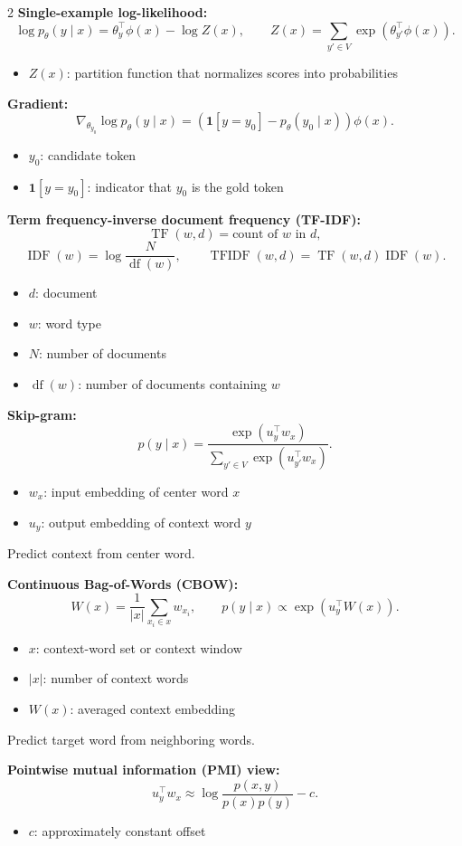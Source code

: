 \documentclass[10pt]{article}
\newenvironment{symdefs}{\begin{itemize}[leftmargin=1.1em, topsep=1pt, itemsep=0pt, parsep=0pt]}{\end{itemize}}
\newcommand{\sym}[2]{\item \textbf{#1}: #2}
\begin{document}
\begin{multicols*}{2}
\textbf{Single-example log-likelihood:}
\[
\log p_\theta(y \mid x)
=
\theta_y^\top \phi(x)-\log Z(x),
\qquad
Z(x)=\sum_{y' \in V}\exp(\theta_{y'}^\top \phi(x)).
\]
\begin{symdefs}
\sym{\(Z(x)\)}{partition function that normalizes scores into probabilities}
\end{symdefs}

\textbf{Gradient:}
\[
\nabla_{\theta_{y_0}}\log p_\theta(y \mid x)
=
\left(\mathbf{1}[y=y_0]-p_\theta(y_0 \mid x)\right)\phi(x).
\]
\begin{symdefs}
\sym{\(y_0\)}{candidate token}
\sym{\(\mathbf{1}[y=y_0]\)}{indicator that \(y_0\) is the gold token}
\end{symdefs}

\textbf{Term frequency-inverse document frequency (TF-IDF):}
\[
\operatorname{TF}(w,d)=\text{count of } w \text{ in } d,
\]
\[
\operatorname{IDF}(w)=\log \frac{N}{\operatorname{df}(w)},
\qquad
\operatorname{TFIDF}(w,d)=\operatorname{TF}(w,d)\operatorname{IDF}(w).
\]
\begin{symdefs}
\sym{\(d\)}{document}
\sym{\(w\)}{word type}
\sym{\(N\)}{number of documents}
\sym{\(\operatorname{df}(w)\)}{number of documents containing \(w\)}
\end{symdefs}

\textbf{Skip-gram:}
\[
p(y \mid x)
=
\frac{\exp(u_y^\top w_x)}
{\sum_{y' \in V}\exp(u_{y'}^\top w_x)}.
\]
\begin{symdefs}
\sym{\(w_x\)}{input embedding of center word \(x\)}
\sym{\(u_y\)}{output embedding of context word \(y\)}
\end{symdefs}
Predict context from center word.

\textbf{Continuous Bag-of-Words (CBOW):}
\[
W(x)=\frac{1}{|x|}\sum_{x_i \in x} w_{x_i},
\qquad
p(y \mid x)\propto \exp(u_y^\top W(x)).
\]
\begin{symdefs}
\sym{\(x\)}{context-word set or context window}
\sym{\(|x|\)}{number of context words}
\sym{\(W(x)\)}{averaged context embedding}
\end{symdefs}
Predict target word from neighboring words.

\textbf{Pointwise mutual information (PMI) view:}
\[
u_y^\top w_x \approx \log \frac{p(x,y)}{p(x)p(y)} - c.
\]
\begin{symdefs}
\sym{\(c\)}{approximately constant offset}
\end{symdefs}


\end{multicols*}
\end{document}

